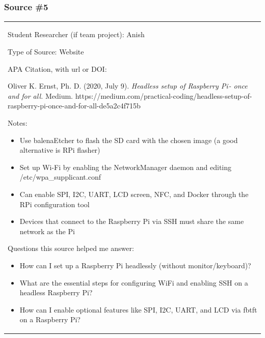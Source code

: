 \subsection{\texorpdfstring{\hfill\break
}{ }}\label{section-4}

\subsubsection{\texorpdfstring{\textbf{Source
\#5}}{Source \#5}}\label{source-5}

\begin{longtable}[]{@{}
  >{\raggedright\arraybackslash}p{}@{}}
\toprule\noalign{}

Student Researcher (if team project): Anish


Type of Source: Website


APA Citation, with url or DOI:

Oliver K. Ernst, Ph. D. (2020, July 9). \emph{Headless setup of
Raspberry Pi - once and for all.} Medium.
https://medium.com/practical-coding/headless-setup-of-raspberry-pi-once-and-for-all-de5a2c4f715b


Notes:

\begin{itemize}
\item
  Use balenaEtcher to flash the SD card with the chosen image (a good
  alternative is RPi flasher)
\item
  Set up Wi-Fi by enabling the NetworkManager daemon and editing
  /etc/wpa\_supplicant.conf
\item
  Can enable SPI, I2C, UART, LCD screen, NFC, and Docker through the RPi
  configuration tool
\item
  Devices that connect to the Raspberry Pi via SSH must share the same
  network as the Pi
\end{itemize}


Questions this source helped me answer:

\begin{itemize}
\item
  How can I set up a Raspberry Pi headlessly (without monitor/keyboard)?
\item
  What are the essential steps for configuring WiFi and enabling SSH on
  a headless Raspberry Pi?
\item
  How can I enable optional features like SPI, I2C, UART, and LCD via
  fbtft on a Raspberry Pi?
\end{itemize}



\end{longtable}
